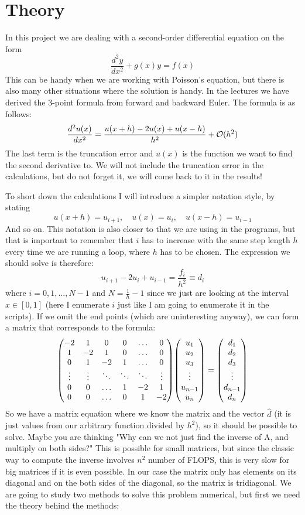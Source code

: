 \documentclass{scrartcl}
\begin{document}
\section{Theory}
In this project we are dealing with a second-order differential equation on the form 
$$\frac{d^2y}{dx^2}+g(x)y=f(x)$$
This can be handy when we are working with Poisson's equation, but there is also many other situations where the solution is handy.
In the lectures we have derived the 3-point formula from forward and backward Euler. The formula is as follows:
$$\frac{d^2u(x)}{dx^2}=\frac{u(x+h)-2u(x)+u(x-h)}{h^2}+{\cal O}(h^2)$$
The last term is the truncation error and $u(x)$ is the function we want to find the second derivative to. We will not include the truncation error in the calculations, but do not forget it, we will come back to it in the results! \par\vspace{3mm}
To short down the calculations I will introduce a simpler notation style, by stating
$$u(x+h)=u_{i+1},\quad u(x)=u_{i},\quad u(x-h)=u_{i-1}$$
And so on. This notation is also closer to that we are using in the programs, but that is important to remember that $i$ has to increase with the same step length $h$ every time we are running a loop, where $h$ has to be chosen. The expression we should solve is therefore:
$$u_{i+1}-2u_i+u_{i-1}=\frac{f_i}{h^2}\equiv d_i$$
where  $i=0,1,...,N-1$ and $N=\frac{1}{h}-1$ since we just are looking at the interval $x\in [0,1]$ (here I enumerate $i$ just like I am going to enumerate it in the scripts).
If we omit the end points (which are uninteresting anyway), we can form a matrix that corresponds to the formula:
$$\mqty(-2&1&0&0&\hdots&0\\
		1&-2&1&0&\hdots&0\\
		0&1&-2&1&\hdots&0\\
		\vdots&\vdots&\ddots&\ddots&\ddots&\vdots\\
		0&0&\hdots&1&-2&1\\
		0&0&\hdots&0&1&-2)
  \mqty(u_1\\u_2\\u_3\\ \vdots\\u_{n-1}\\u_n)=
  \mqty(d_1\\d_2\\d_3\\ \vdots\\d_{n-1}\\d_n)$$
So we have a matrix equation where we know the matrix and the vector $\hat{d}$ (it is just values from our arbitrary function divided by $h^2$), so it should be possible to solve. Maybe you are thinking "Why can we not just find the inverse of A, and multiply on both sides?" This is possible for small matrices, but since the classic way to compute the inverse involves $n^2$ number of FLOPS, this is very slow for big matrices if it is even possible. In our case the matrix only has elements on its diagonal and on the both sides of the diagonal, so the matrix is tridiagonal. We are going to study two methods to solve this problem numerical, but first we need the theory behind the methods:
		
\end{document}
